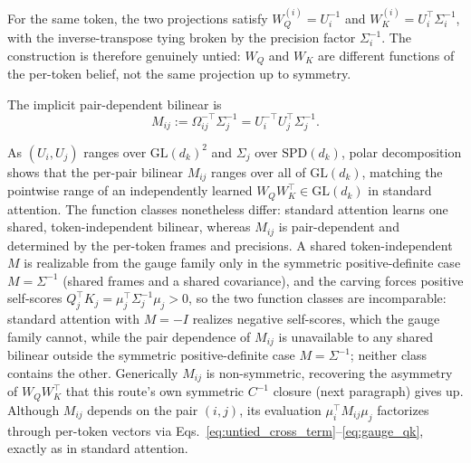 For the same token, the two projections satisfy $W_Q^{(i)} = U_i^{-1}$ and $W_K^{(i)} = U_i^\top \Sigma_i^{-1}$, with the inverse-transpose tying broken by the precision factor $\Sigma_i^{-1}$. The construction is therefore genuinely untied: $W_Q$ and $W_K$ are different functions of the per-token belief, not the same projection up to symmetry.

The implicit pair-dependent bilinear is
\begin{equation}
M_{ij} := \Omega_{ij}^{-\top}\Sigma_j^{-1} = U_i^{-\top} U_j^\top \Sigma_j^{-1}.
\label{eq:gauge_bilinear}
\end{equation}

As $(U_i, U_j)$ ranges over $\mathrm{GL}(d_k)^2$ and $\Sigma_j$ over $\mathrm{SPD}(d_k)$, polar decomposition shows that the per-pair bilinear $M_{ij}$ ranges over all of $\mathrm{GL}(d_k)$, matching the pointwise range of an independently learned $W_Q W_K^\top \in \mathrm{GL}(d_k)$ in standard attention. The function classes nonetheless differ: standard attention learns one shared, token-independent bilinear, whereas $M_{ij}$ is pair-dependent and determined by the per-token frames and precisions. A shared token-independent $M$ is realizable from the gauge family only in the symmetric positive-definite case $M = \Sigma^{-1}$ (shared frames and a shared covariance), and the carving forces positive self-scores $Q_j^\top K_j = \mu_j^\top\Sigma_j^{-1}\mu_j > 0$, so the two function classes are incomparable: standard attention with $M = -I$ realizes negative self-scores, which the gauge family cannot, while the pair dependence of $M_{ij}$ is unavailable to any shared bilinear outside the symmetric positive-definite case $M = \Sigma^{-1}$; neither class contains the other. Generically $M_{ij}$ is non-symmetric, recovering the asymmetry of $W_QW_K^\top$ that this route's own symmetric $C^{-1}$ closure (next paragraph) gives up. Although $M_{ij}$ depends on the pair $(i,j)$, its evaluation $\mu_i^\top M_{ij}\mu_j$ factorizes through per-token vectors via Eqs.~\eqref{eq:untied_cross_term}--\eqref{eq:gauge_qk}, exactly as in standard attention.

